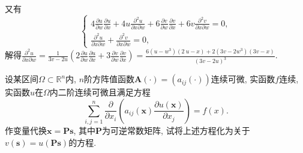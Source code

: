 \begin{quiza}
\begin{solution}
又有\[\begin{cases}
4\frac{\partial u}{\partial w}\frac{\partial u}{\partial x}+4u\frac{\partial^2u}{\partial x\partial w}+6\frac{\partial v}{\partial w}\frac{\partial v}{\partial x}+6v\frac{\partial^2v}{\partial x\partial w}=0,\\
\frac{\partial^2u}{\partial x\partial w}+\frac{\partial^2v}{\partial x\partial w}=0,
\end{cases}\]解得\(\frac{\partial^2u}{\partial x\partial w}=\frac{1}{3v-2u}\left(2\frac{\partial u}{\partial w}\frac{\partial u}{\partial x}+3\frac{\partial v}{\partial w}\frac{\partial v}{\partial x}\right)=\frac{6(u-w^3)(2\!\:u-x)+2(3v-2w^3)(3v-x)}{(3v-2u)^3}.\)
\end{solution}
\woe 设某区间\(\Omega\subset\mathbb{R}^n\)内, \(n\)阶方阵值函数\(\boldsymbol{A}(\cdot)=\left(a_{ij}(\cdot)\right)\)连续可微, 实函数\(f\)连续, 实函数\(u\)在\(\Omega\)内二阶连续可微且满足方程\[\sum_{i,j=1}^{n}\frac{\partial}{\partial x_i}\left(a_{ij}\left(\boldsymbol{x}\right)\frac{\partial u(\boldsymbol{x})}{\partial x_j}\right)=f(x).\]
作变量代换\(\boldsymbol{x}=\boldsymbol{Ps}\), 其中\(\boldsymbol{P}\)为可逆常数矩阵, 试将上述方程化为关于\(v(\boldsymbol{s})=u(\boldsymbol{Ps})\)的方程.
\begin{solution}


\end{solution}
\end{quiza}
